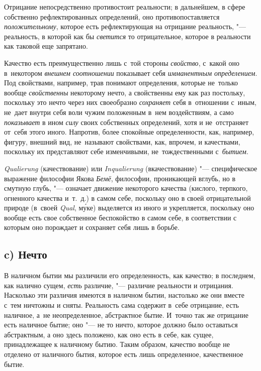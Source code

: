 Отрицание непосредственно противостоит реальности; в дальнейшем, в сфере
собственно рефлектированных определений, оно противопоставляется
{\em положительному}, которое есть рефлектирующая на
отрицание реальность, "--- реальность, в которой как бы
{\em светится} то отрицательное, которое в реальности
как таковой еще запрятано.

Качество есть преимущественно лишь с~той стороны {\em свойство}, с~какой оно
в~некотором {\em внешнем соотношении} показывает себя {\em имманентным
определением}. Под свойствами, например, трав понимают определения, которые
не~только вообще {\em свойственны} некоторому нечто, а свойственны ему как раз
постольку, поскольку это нечто через них своеобразно {\em сохраняет} себя
в~отношении с~иным, не~дает внутри себя воли чужим положенным в~нем
воздействиям, а само {\em показывает} в ином {\em силу} своих собственных
определений, хотя и не~отстраняет от~себя этого иного. Напротив, более
спокойные определенности, как, например, фигуру, внешний вид, не~называют
свойствами, как, впрочем, и качествами, поскольку их представляют себе
изменчивыми, не~тождественными с~{\em бытием}.

{\em Quali\-erung} (качествование) или {\em Inquali\-erung} (вкачествование)
"--- специфическое выражение философии Якова {\em Бемё}, философии, проникающей
вглубь, но в смутную глубь, "--- означает движение некоторого качества
(кислого, терпкого, огненного качества и~т.~д.) в самом себе, поскольку оно в
своей отрицательной природе (в~своей {\em Qual},
м\'{у}ке) выделяется из иного и укрепляется, поскольку оно вообще есть свое
собственное беспокойство в самом себе, в соответствии с которым оно порождает
и сохраняет себя лишь в борьбе.

\subsection[c) Нечто]{c) Нечто}

В наличном бытии мы различили его определенность, как качество; в последнем,
как налично сущем, {\em есть} различие, "--- различие реальности и отрицания.
Насколько эти различия имеются в наличном бытии, настолько же они вместе с~тем
ничтожны и сняты. Реальность сама содержит в~себе отрицание, есть наличное,
а~не неопределенное, абстрактное бытие. И~точно так же отрицание есть наличное
бытие; оно "--- не то ничто, которое должно было оставаться абстрактным, а оно
здесь положено, как оно есть в себе, как сущее, принадлежащее к наличному
бытию. Таким образом, качество вообще не отделено от наличного бытия, которое
есть лишь определенное, качественное бытие.

